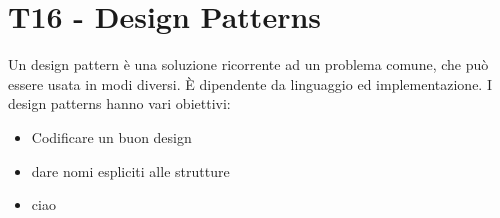 \documentclass{article}
\begin{document}
\section{T16 - Design Patterns}

Un design pattern è una soluzione ricorrente ad un problema comune, che può essere usata
in modi diversi. È dipendente da linguaggio ed implementazione. I design patterns hanno vari obiettivi:
\begin{itemize}
    \item Codificare un buon design
    \item dare nomi espliciti alle strutture
    \item ciao
\end{itemize}
\end{document}
